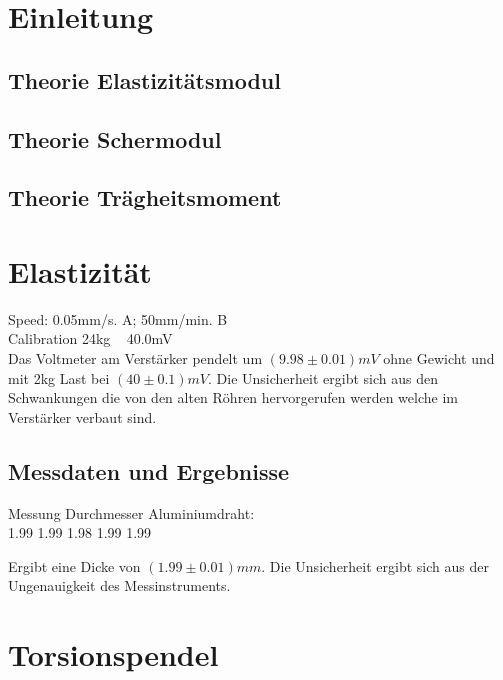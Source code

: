 \documentclass[12pt,a4paper]{article}
\begin{document}
\pagebreak
\setlength{\columnsep}{20pt}
\begin{multicols}{2}
\section{Einleitung}

\subsection{Theorie Elastizitätsmodul}

\subsection{Theorie Schermodul}

\subsection{Theorie Trägheitsmoment}

\section{Elastizität}

Speed: 0.05mm/s. A; 50mm/min. B\\
Calibration 24kg ~ 40.0mV\\
Das Voltmeter am Verstärker pendelt um $(9.98 \pm 0.01)mV$ ohne Gewicht und mit 2kg Last bei $(40 \pm 0.1)mV$. Die Unsicherheit ergibt sich aus den Schwankungen die von den alten Röhren hervorgerufen werden welche im Verstärker verbaut sind.

\subsection{Messdaten und Ergebnisse}
Messung Durchmesser Aluminiumdraht:\\
1.99
1.99
1.98
1.99
1.99

Ergibt eine Dicke von \textbf{$(1.99 \pm 0.01)mm$}. Die Unsicherheit ergibt sich aus der Ungenauigkeit des Messinstruments.\\




\section{Torsionspendel}



\end{multicols}
\end{document}
